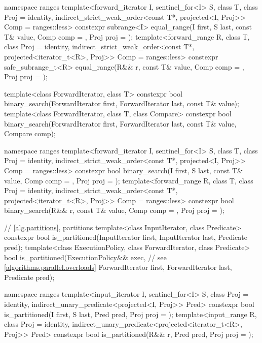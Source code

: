 \begin{codeblock}
{  namespace ranges {
    template<forward_iterator I, sentinel_for<I> S, class T, class Proj = identity,
             indirect_strict_weak_order<const T*, projected<I, Proj>> Comp = ranges::less>
      constexpr subrange<I>
        equal_range(I first, S last, const T& value, Comp comp = {}, Proj proj = {});
    template<forward_range R, class T, class Proj = identity,
             indirect_strict_weak_order<const T*, projected<iterator_t<R>, Proj>> Comp =
               ranges::less>
      constexpr safe_subrange_t<R>
        equal_range(R&& r, const T& value, Comp comp = {}, Proj proj = {});
  }

  template<class ForwardIterator, class T>
    constexpr bool
      binary_search(ForwardIterator first, ForwardIterator last,
                    const T& value);
  template<class ForwardIterator, class T, class Compare>
    constexpr bool
      binary_search(ForwardIterator first, ForwardIterator last,
                    const T& value, Compare comp);

  namespace ranges {
    template<forward_iterator I, sentinel_for<I> S, class T, class Proj = identity,
             indirect_strict_weak_order<const T*, projected<I, Proj>> Comp = ranges::less>
      constexpr bool binary_search(I first, S last, const T& value, Comp comp = {},
                                   Proj proj = {});
    template<forward_range R, class T, class Proj = identity,
             indirect_strict_weak_order<const T*, projected<iterator_t<R>, Proj>> Comp =
               ranges::less>
      constexpr bool binary_search(R&& r, const T& value, Comp comp = {},
                                   Proj proj = {});
  }

  // \ref{alg.partitions}, partitions
  template<class InputIterator, class Predicate>
    constexpr bool is_partitioned(InputIterator first, InputIterator last, Predicate pred);
  template<class ExecutionPolicy, class ForwardIterator, class Predicate>
    bool is_partitioned(ExecutionPolicy&& exec,                 // see \ref{algorithms.parallel.overloads}
                        ForwardIterator first, ForwardIterator last, Predicate pred);

  namespace ranges {
    template<input_iterator I, sentinel_for<I> S, class Proj = identity,
             indirect_unary_predicate<projected<I, Proj>> Pred>
      constexpr bool is_partitioned(I first, S last, Pred pred, Proj proj = {});
    template<input_range R, class Proj = identity,
             indirect_unary_predicate<projected<iterator_t<R>, Proj>> Pred>
      constexpr bool is_partitioned(R&& r, Pred pred, Proj proj = {});
  }

}
\end{codeblock}
